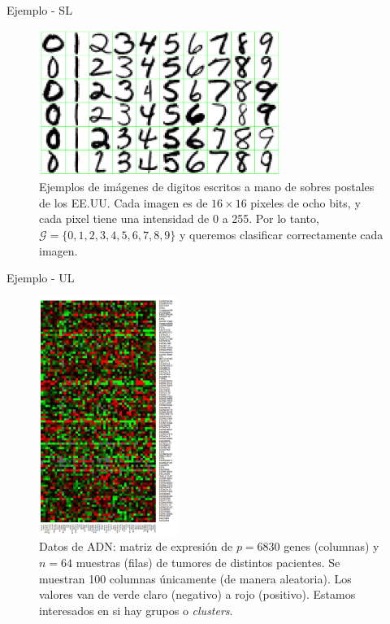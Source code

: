 \documentclass[usenames,dvipsnames]{beamer} %
\begin{document}
\begin{frame}{Ejemplo - SL}
    \begin{figure}\label{fig:ej_numeros}
    \centering
        \includegraphics[width=0.70\textwidth]{images/esl/fig_1_2.PNG}
    \caption{Ejemplos de im\'agenes de digitos escritos a mano de sobres postales de los EE.UU. Cada imagen es de $16\times16$ pixeles de ocho bits, y cada pixel tiene una intensidad de 0 a 255. Por lo tanto, $\mathcal{G}=\{0,1,2,3,4,5,6,7,8,9\}$ y queremos clasificar correctamente cada imagen.}
    \end{figure}
\end{frame}

\begin{frame}{Ejemplo - UL}
    \begin{figure}\label{fig:ej_adn}
        \centering
        \includegraphics[width=0.40\textwidth, angle=270]{images/esl/fig_1_3.PNG}
        \caption{Datos de ADN: matriz de expresi\'on de $p=6830$ genes (columnas) y $n=64$ muestras (filas) de tumores de distintos pacientes. Se muestran 100 columnas \'unicamente (de manera aleatoria). Los valores van de verde claro (negativo) a rojo (positivo). Estamos interesados en si hay grupos o \textit{clusters}.}
    \end{figure}
\end{frame}
\end{document}
